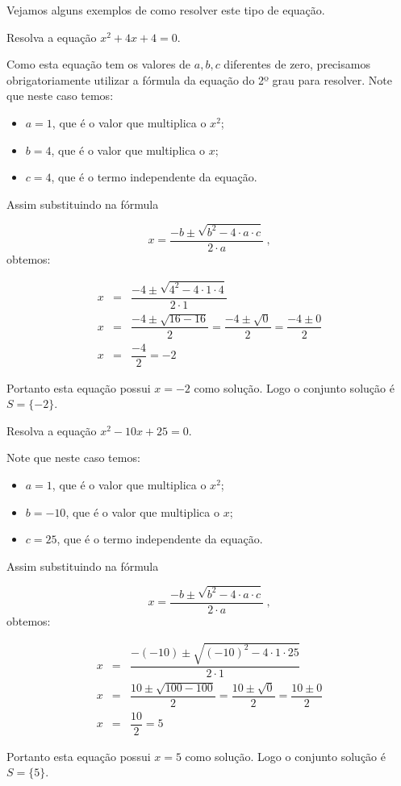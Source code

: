  Vejamos alguns exemplos de como resolver este tipo de equação.
 \begin{exem} 
  Resolva a equação $x^2 + 4x + 4= 0$.

 Como esta equação tem os valores de $a, b, c$ diferentes de zero, precisamos obrigatoriamente utilizar a fórmula da equação do 2º grau para resolver. Note que neste caso temos:
  \begin{itemize}
  \item $a= 1$, que é o valor que multiplica o $x^2$;
  \item $b= 4$, que é o valor que multiplica o $x$;
  \item $c= 4$, que é o termo independente da equação.
  \end{itemize}
  Assim substituindo na fórmula

\begin{equation}
x = \dfrac{-b \pm \sqrt{b^2 - 4 \cdot a \cdot c}}{2 \cdot a} \ ,
\end{equation}
 obtemos:

 \begin{eqnarray*}
 x &=& \dfrac{-4 \pm \sqrt{4^2 - 4 \cdot 1 \cdot 4}}{2 \cdot 1} \\
 x &=& \dfrac{-4 \pm \sqrt{16 - 16}}{2}= \dfrac{-4 \pm \sqrt{0}}{2}= \dfrac{-4 \pm 0}{2} \\
 x &=& \dfrac{-4}{2}= -2
 \end{eqnarray*}

 Portanto esta equação possui $x= -2$ como solução. Logo o conjunto solução é $S= \{-2\}$.
 \end{exem}
 
 \begin{exem}
 Resolva a equação $x^2 - 10x + 25= 0$.

 Note que neste caso temos:
  \begin{itemize}
  \item $a= 1$, que é o valor que multiplica o $x^2$;
  \item $b= -10$, que é o valor que multiplica o $x$;
  \item $c= 25$, que é o termo independente da equação.
  \end{itemize}
  Assim substituindo na fórmula

\begin{equation}
x = \dfrac{-b \pm \sqrt{b^2 - 4 \cdot a \cdot c}}{2 \cdot a} \ ,
\end{equation}
 obtemos:

 \begin{eqnarray*}
 x &=& \dfrac{-(-10) \pm \sqrt{(-10)^2 - 4 \cdot 1 \cdot 25}}{2 \cdot 1} \\
 x &=& \dfrac{10 \pm \sqrt{100 - 100}}{2}= \dfrac{10 \pm \sqrt{0}}{2}= \dfrac{10 \pm 0}{2} \\
 x &=& \dfrac{10}{2}= 5
 \end{eqnarray*}

 Portanto esta equação possui $x= 5$ como solução.  Logo o conjunto solução é $S= \{5\}$.
\end{exem}
 

